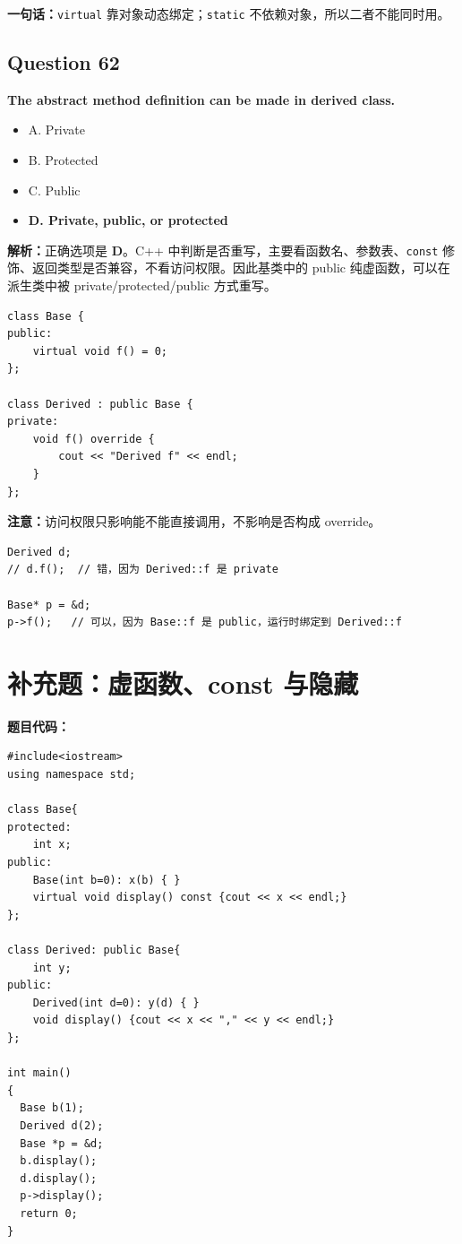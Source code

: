 \documentclass[11pt, a4paper]{article}
\begin{document}
\textbf{一句话：}\texttt{virtual} 靠对象动态绑定；\texttt{static} 不依赖对象，所以二者不能同时用。


\subsection*{Question 62}
\textbf{The abstract method definition can be made \underline{\hspace{2cm}} in derived class.}
\begin{itemize}
    \item A. Private
    \item B. Protected
    \item C. Public
    \item \textbf{D. Private, public, or protected}
\end{itemize}

\textbf{解析：}正确选项是 \textbf{D}。C++ 中判断是否重写，主要看函数名、参数表、\texttt{const} 修饰、返回类型是否兼容，不看访问权限。因此基类中的 public 纯虚函数，可以在派生类中被 private/protected/public 方式重写。

\begin{lstlisting}
class Base {
public:
    virtual void f() = 0;
};

class Derived : public Base {
private:
    void f() override {
        cout << "Derived f" << endl;
    }
};
\end{lstlisting}

\textbf{注意：}访问权限只影响能不能直接调用，不影响是否构成 override。
\begin{lstlisting}
Derived d;
// d.f();  // 错，因为 Derived::f 是 private

Base* p = &d;
p->f();   // 可以，因为 Base::f 是 public，运行时绑定到 Derived::f
\end{lstlisting}

\newpage
\section*{补充题：虚函数、const 与隐藏}

\textbf{题目代码：}
\begin{lstlisting}
#include<iostream>
using namespace std;

class Base{
protected:
    int x;
public:
    Base(int b=0): x(b) { }
    virtual void display() const {cout << x << endl;}
};

class Derived: public Base{
    int y;
public:
    Derived(int d=0): y(d) { }
    void display() {cout << x << "," << y << endl;}
};

int main()
{
  Base b(1);
  Derived d(2);
  Base *p = &d;
  b.display();
  d.display();
  p->display();
  return 0;
}
\end{lstlisting}
\end{document}
